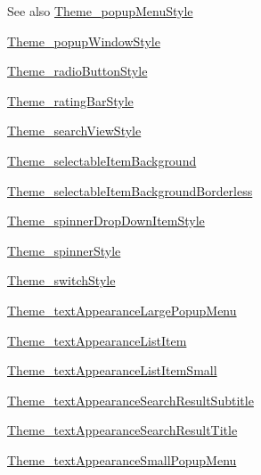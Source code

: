 \begin{DoxySeeAlso}{See also}
\hyperlink{classcheck_1_1test_1_1_r_1_1styleable_a84e7e01578f21a4c36f013d3e5d3b917}{Theme\+\_\+popup\+Menu\+Style} 

\hyperlink{classcheck_1_1test_1_1_r_1_1styleable_a84838496bac2e683af2e800bfafd3f41}{Theme\+\_\+popup\+Window\+Style} 

\hyperlink{classcheck_1_1test_1_1_r_1_1styleable_a28affc2ca7d484ddc9e704772938a600}{Theme\+\_\+radio\+Button\+Style} 

\hyperlink{classcheck_1_1test_1_1_r_1_1styleable_ac5ebe24516424df00451d25bb71bf29c}{Theme\+\_\+rating\+Bar\+Style} 

\hyperlink{classcheck_1_1test_1_1_r_1_1styleable_adf1afa34cedcf221081b21bda1f70e5c}{Theme\+\_\+search\+View\+Style} 

\hyperlink{classcheck_1_1test_1_1_r_1_1styleable_a0316097f83d9af63e8806ec4839f94a9}{Theme\+\_\+selectable\+Item\+Background} 

\hyperlink{classcheck_1_1test_1_1_r_1_1styleable_ab577cbb82ea3ae0fddb617a7cbc27530}{Theme\+\_\+selectable\+Item\+Background\+Borderless} 

\hyperlink{classcheck_1_1test_1_1_r_1_1styleable_ac74684f630293fb28782a9ce322bad2c}{Theme\+\_\+spinner\+Drop\+Down\+Item\+Style} 

\hyperlink{classcheck_1_1test_1_1_r_1_1styleable_aee62b48940c1b2da28bf4a38059b29ff}{Theme\+\_\+spinner\+Style} 

\hyperlink{classcheck_1_1test_1_1_r_1_1styleable_a2816120337bd94eb4728d7a72ace5ce4}{Theme\+\_\+switch\+Style} 

\hyperlink{classcheck_1_1test_1_1_r_1_1styleable_a3c2ff2e7da8190569961b889ced77fcd}{Theme\+\_\+text\+Appearance\+Large\+Popup\+Menu} 

\hyperlink{classcheck_1_1test_1_1_r_1_1styleable_a1a1b8a87f2acabee24a7e564989bfbe3}{Theme\+\_\+text\+Appearance\+List\+Item} 

\hyperlink{classcheck_1_1test_1_1_r_1_1styleable_abe557b2f9da24355df498eac97be2c53}{Theme\+\_\+text\+Appearance\+List\+Item\+Small} 

\hyperlink{classcheck_1_1test_1_1_r_1_1styleable_a1d39c6b5da48087c8f55a027e4050139}{Theme\+\_\+text\+Appearance\+Search\+Result\+Subtitle} 

\hyperlink{classcheck_1_1test_1_1_r_1_1styleable_aad7da0b4a2302f6cd5981784f6507c2d}{Theme\+\_\+text\+Appearance\+Search\+Result\+Title} 

\hyperlink{classcheck_1_1test_1_1_r_1_1styleable_a5d74a42ce30244146c66202e8a63600e}{Theme\+\_\+text\+Appearance\+Small\+Popup\+Menu} 


\end{DoxySeeAlso}
